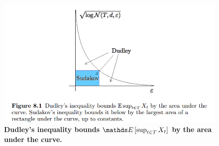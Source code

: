 \documentclass[11pt]{article}
\begin{document}
\begin{itemize}
\begin{figure}
\begin{minipage}[t]{1\linewidth}
  \centering
  \centerline{\includegraphics[scale = 0.45]{dudley_inequality.png}}
\end{minipage}
\caption{\footnotesize{\textbf{Dudley's inequality bounds $\E{}{\sup_{t\in T}X_t }$ by the area under the curve.   \citep{vershynin2018high}}}}
\label{fig: dudley_inequality}
\end{figure}



\end{itemize}
\end{document}
